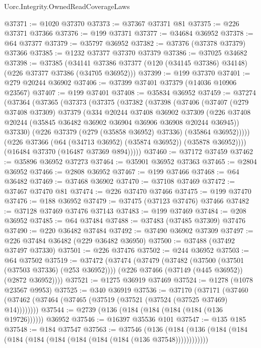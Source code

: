 \begin{lexlean}{Uorc.Integrity.OwnedReadCoverageLaws}
\begin{coremodule}
@37371 := @1020 @37370
@37373 := @37367 @37371 @81
@37375 := @226 @37371 @37366
@37376 := @199 @37371
@37377 := @34684 @36952
@37378 := @64 @37377
@37379 := @35797 @36952
@37382 := @37376 (@37378 @37379) @37366
@37385 := @1232 @37377 @37370 @37379
@37386 := @37025 @34682
@37398 := @37385
    (@34141 @37386 @37377 (@120 (@34145 @37386) @34148) (@226 @37377 @37386 (@34705 @36952)))
@37399 := @199 @37370
@37401 := @279 @20244 @36902
@37406 := @37399 @37401 @37379 (@14036 @10906 @23567)
@37407 := @199 @37401
@37408 := @35834 @36952
@37459 := @37274
    (@37364
      (@37365
        (@37373
          (@37375
            (@37382
              (@37398
                (@37406
                  (@37407
                    (@279 @37408 @37309)
                    @37379
                    (@334
                      @20244
                      @37408
                      @36902
                      @37309
                      (@226 @37408 @20244 (@35845 @36482 @36902 @36904 @36906 @36908 @20244 @36945))
                      @37330)
                    (@226 @37379 (@279 (@35858 @36952) @37336) (@35864 @36952)))))
              (@226 @37366 (@64 (@34713 @36952) (@35874 @36952)) (@35878 @36952))))
          (@16484 @37370 (@16487 @37369 @894)))))
@37460 := @37172 @37459
@37462 := @35896 @36952 @37273
@37464 := @35901 @36952 @37363
@37465 := @2804 @36952
@37466 := @2808 @36952
@37467 := @199 @37466
@37468 := @64 @36482
@37469 := @37468 @36902
@37470 := @37108 @37469
@37472 := @37467 @37470 @81
@37474 := @226 @37470 @37466
@37475 := @199 @37470
@37476 := @188 @36952
@37479 := @37475 (@37123 @37476) @37466
@37482 := @37128 @37469 @37476 @37143
@37483 := @199 @37469
@37484 := @208 @36952
@37485 := @64 @37484
@37488 := @37483 (@37485 @37309) @37476
@37490 := @220 @36482 @37484
@37492 := @37490 @36902 @37309
@37497 := @226 @37484 @36482 (@229 @36482 @36950)
@37500 := @37488 (@37492 @37497 @37330)
@37501 := @226 @37476
@37502 := @244 @36952
@37503 := @64 @37502
@37519 := @37472
    (@37474
      (@37479
        (@37482 (@37500 (@37501 (@37503 @37336) (@253 @36952))))
        (@226 @37466 (@37149 (@445 @36952)) (@2872 @36952))))
@37521 := @1275 @36919 @37469
@37524 := @1278 (@1078 @23567 @9953)
@37525 := @340 @36919
@37536 := @37170
    (@37171 (@37460 (@37462 (@37464 (@37465 (@37519 (@37521 (@37524 (@37525 @37469) @14))))))))
@37544 := @2739 (@136 (@184 (@184 (@184 (@184 (@136 @19726)))))) @36952
@37546 := @16397 @35536 @101
@37547 := @135 @185
@37548 := @184 @37547
@37563 := @37546
    (@136 (@184 (@136 (@184 (@184 (@184 (@184 (@184 (@184 (@184 (@184 (@136 @37548))))))))))))

\end{coremodule}
\end{lexlean}
